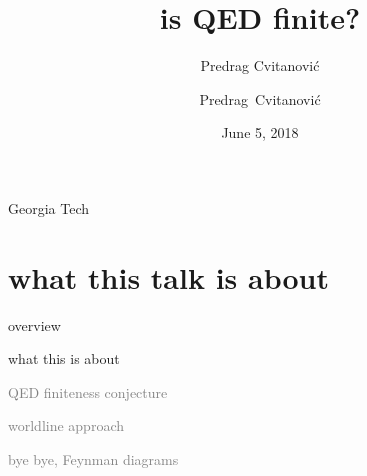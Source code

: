 



\usepackage[font=scriptsize, labelfont=bf]{caption}
\usepackage[
    backend=biber,  %
    sorting=nyt,
    style=numeric, %
    natbib=true,
    style=phys, %
    biblabel= brackets, %
    articletitle=false, %
    pageranges = true , %
    sortlocale=en_US,
    firstinits=true,
    url=false, %
    doi=false, %
    eprint=false
]{biblatex}


\renewcommand{\Ssym}[1]{{\ensuremath{m_{#1}}}}    %




\title{
{\huge is QED finite?}
}
\author{Predrag Cvitanovi\'c}
\author[Cvitanovi\'c]
{
  \textcolor{green!50!black}{
  {Predrag~Cvitanovi\'c
  }	%
  }
}
\institute
{
                Georgia Tech
 }
\date{June 5, 2018}

\begin{frame}
  \titlepage
\end{frame}

\section[what this talk is about]
 {what this talk is about}

\begin{frame}{overview}
\begin{enumerate}
              \item {\Large
what this is about
                  }\textcolor{gray}{\small
              \item
QED finiteness conjecture
              \item
worldline approach
              \item
bye bye, Feynman diagrams
                    }
\end{enumerate}
\end{frame}


